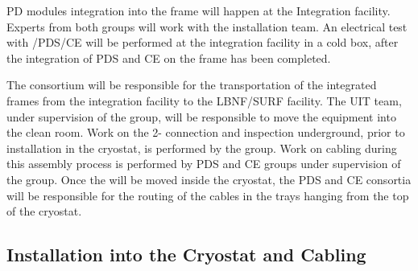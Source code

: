 

PD modules integration into the  frame will happen at the Integration facility. Experts from both groups will work with the installation team. 
An electrical test with /PDS/CE will be performed at the integration facility in a cold box, after the integration of PDS and CE on the  frame has been completed.

The  consortium will be responsible for the transportation of the integrated  frames from the integration facility to the LBNF/SURF facility. 
The UIT team, under supervision of the  group, will be responsible to move the equipment into the clean room. 
Work on the 2- connection and inspection underground, prior to installation in the cryostat, is performed by the  group.
Work on cabling during this assembly process is performed by PDS and CE groups under supervision of the  group.
Once the  will be moved inside the cryostat, the PDS and CE consortia will be responsible for the routing of the cables in the trays hanging from the top of the cryostat. 


\subsection{Installation into the Cryostat and Cabling}
\label{sec:fdsp-pd-install-pd-cryo}

